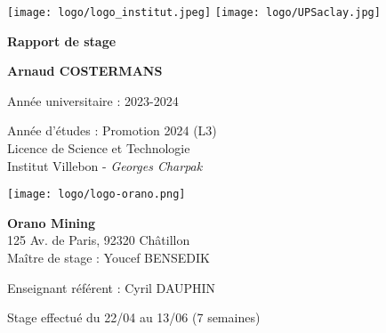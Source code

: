 \begin{titlepage}
    \centering

    \texttt{[image: logo/logo\_institut.jpeg]} \texttt{[image: logo/UPSaclay.jpg]}

    \vspace{1.5cm}
    {\LARGE\textbf{Rapport de stage}\par}

    \vspace{1.5cm}
    {\large\textbf{Arnaud COSTERMANS}\par}

    \vspace{0.5cm}
    Année universitaire : 2023-2024

    \vspace{0.5cm}
    Année d'études : Promotion 2024 (L3) \\
    Licence de Science et Technologie \\
    Institut Villebon - \textit{Georges Charpak}

    \vspace{2cm}
    \texttt{[image: logo/logo-orano.png]}

    \vspace{0.5cm}
    \textbf{Orano Mining}\\
    125 Av. de Paris, 92320 Châtillon\\
    \vspace{0.5cm}
    Maître de stage : Youcef BENSEDIK

    \vspace{0.5cm}
    Enseignant référent : Cyril DAUPHIN

    \vspace{0.5cm}
    Stage effectué du 22/04 au 13/06 (7 semaines)
\end{titlepage}
\clearpage